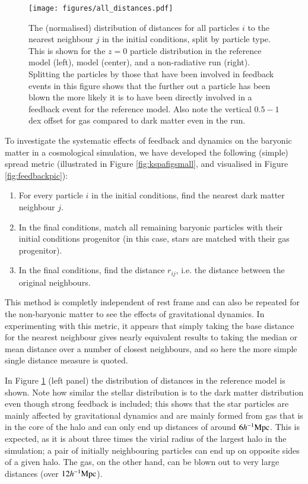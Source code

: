 \begin{figure}
    \centering
    \texttt{[image: figures/all\_distances.pdf]}
    \vspace{-0.7cm}
    \caption{
        The (normalised) distribution of distances for all particles $i$ to
        the nearest neighbour $j$ in the initial conditions, split by particle
        type. This is shown for the $z=0$ particle distribution in the
        reference model (left), \nojet{} model (center), and a non-radiative
        run (right). Splitting the particles by those that have been
        involved in feedback events in this figure shows that the further
        out a particle has been blown the more likely it is to have been
        directly involved in a feedback event for the reference model. Also note
        the vertical $0.5-1$ dex offset for gas compared to dark matter even in
        the \nojet{} run. 
    }\label{fig:feedbackdistance}
\end{figure}


To investigate the systematic effects of feedback and dynamics on the baryonic
matter in a cosmological simulation, we have developed the following (simple)
spread metric (illustrated in Figure \ref{fig:kspafigsmall}, and visualised in Figure \ref{fig:feedbackpic}):

\begin{enumerate}
	\item For every particle $i$ in the initial conditions, find the nearest
              dark matter neighbour $j$.
	\item In the final conditions, match all remaining baryonic particles
	      with their initial conditions progenitor (in this case, stars are
	      matched with their gas progenitor).
	\item In the final conditions, find the distance $r_{ij}$, i.e. the
	      distance between the original neighbours.
\end{enumerate}

This method is completly independent of rest frame and can also be repeated
for the non-baryonic matter to see the effects of gravitational dynamics. In
experimenting with this metric, it appears that simply taking the base
distance for the nearest neighbour gives nearly equivalent results to taking
the median or mean distance over a number of closest neighbours, and so here
the more simple single distance measure is quoted.

In Figure \ref{fig:feedbackdistance} (left panel) the distribution of
distances in the reference model is shown. Note how similar the stellar
distribution is to the dark matter distribution even though strong feedback is
included; this shows that the star particles are mainly affected by
gravitational dynamics and  are mainly formed from gas that is in the core of
the halo and can only end up distances of around $6 h^{-1}{\rm Mpc}{}$. This is
expected, as it is about three times the virial radius of the largest halo in
the simulation; a pair of initially neighbouring particles can end up on
opposite sides of a given halo. The gas, on the other hand, can be blown out
to very large distances (over $12 h^{-1}{\rm Mpc}{}$).

